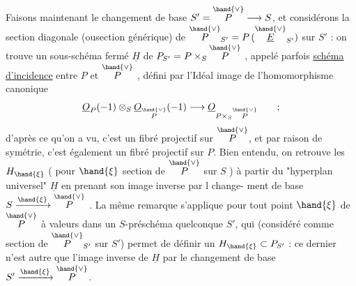 
Faisons maintenant le changement de base $S'=\overset{\hand{\vee}}{P}\longrightarrow S$, et considérons
la section diagonale (ousection générique) de $\overset{\hand{\vee}}{P}_{S'} = P\,(\overset{\hand{\vee}}{\underline{E}}_{S'})$ sur $S'$ :
on trouve un sous-schéma fermé $\underline{H}$ de $P_{S'} = P\times_S\overset{\hand{\vee}}{P}$ , appelé parfois
\uline{schéma d'incidence} entre $P$ et $\overset{\hand{\vee}}{P}$ , défini par l'Idéal image de
l'homomorphisme canonique
\[ \underline{O}_P(-1)\otimes_S\underline{O}_{\overset{\hand{\vee}}{P}}(-1)\longrightarrow \underline{O}_{P\times_S\overset{\hand{\vee}}{P}} \qquad ; \]
d'après ce qu'on a vu, c'est un fibré projectif sur $\overset{\hand{\vee}}{P}$, et par raison de
symétrie, c'est également un fibré projectif sur $P$. Bien entendu, on
retrouve les $H_{\hand{\xi}}$ ( pour $\hand{\xi}$ section de $\overset{\hand{\vee}}{P}$ sur $S$ )\hand{,} à partir
du "hyperplan universel" $\underline{H}$\hand{,} en prenant son image inverse par l change-%
ment de base $S\xrightarrow{\hand{\xi}}\overset{\hand{\vee}}{P}$ . La même remarque s'applique pour tout point
$\hand{\xi}$ de $\overset{\hand{\vee}}{P}$ à valeurs dans un $S$-préschéma quelconque $S'$, qui (considéré comme
section de $\overset{\hand{\vee}}{P}_{S'}$ sur $S'$) permet de définir un $H_{\hand{\xi}}\subset P_{S'}$ : ce dernier n'est
autre que l'image inverse de $\underline{H}$ par le changement de base $S'\xrightarrow{\hand{\xi}}\overset{\hand{\vee}}{P}$.

